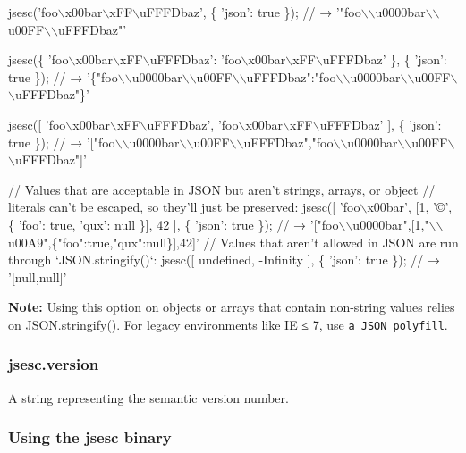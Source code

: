 \begin{DoxyCode}
jsesc('foo\(\backslash\)x00bar\(\backslash\)xFF\(\backslash\)uFFFDbaz', \{
  'json': true
\});
// → '"foo\(\backslash\)\(\backslash\)u0000bar\(\backslash\)\(\backslash\)u00FF\(\backslash\)\(\backslash\)uFFFDbaz"'

jsesc(\{ 'foo\(\backslash\)x00bar\(\backslash\)xFF\(\backslash\)uFFFDbaz': 'foo\(\backslash\)x00bar\(\backslash\)xFF\(\backslash\)uFFFDbaz' \}, \{
  'json': true
\});
// → '\{"foo\(\backslash\)\(\backslash\)u0000bar\(\backslash\)\(\backslash\)u00FF\(\backslash\)\(\backslash\)uFFFDbaz":"foo\(\backslash\)\(\backslash\)u0000bar\(\backslash\)\(\backslash\)u00FF\(\backslash\)\(\backslash\)uFFFDbaz"\}'

jsesc([ 'foo\(\backslash\)x00bar\(\backslash\)xFF\(\backslash\)uFFFDbaz', 'foo\(\backslash\)x00bar\(\backslash\)xFF\(\backslash\)uFFFDbaz' ], \{
  'json': true
\});
// → '["foo\(\backslash\)\(\backslash\)u0000bar\(\backslash\)\(\backslash\)u00FF\(\backslash\)\(\backslash\)uFFFDbaz","foo\(\backslash\)\(\backslash\)u0000bar\(\backslash\)\(\backslash\)u00FF\(\backslash\)\(\backslash\)uFFFDbaz"]'

// Values that are acceptable in JSON but aren’t strings, arrays, or object
// literals can’t be escaped, so they’ll just be preserved:
jsesc([ 'foo\(\backslash\)x00bar', [1, '©', \{ 'foo': true, 'qux': null \}], 42 ], \{
  'json': true
\});
// → '["foo\(\backslash\)\(\backslash\)u0000bar",[1,"\(\backslash\)\(\backslash\)u00A9",\{"foo":true,"qux":null\}],42]'
// Values that aren’t allowed in JSON are run through `JSON.stringify()`:
jsesc([ undefined, -Infinity ], \{
  'json': true
\});
// → '[null,null]'
\end{DoxyCode}


{\bfseries Note\+:} Using this option on objects or arrays that contain non-\/string values relies on {\ttfamily J\+S\+O\+N.\+stringify()}. For legacy environments like IE ≤ 7, use \href{http://bestiejs.github.io/json3/}{\tt a {\ttfamily J\+S\+ON} polyfill}.

\subsubsection*{{\ttfamily jsesc.\+version}}

A string representing the semantic version number.

\subsubsection*{Using the {\ttfamily jsesc} binary}

